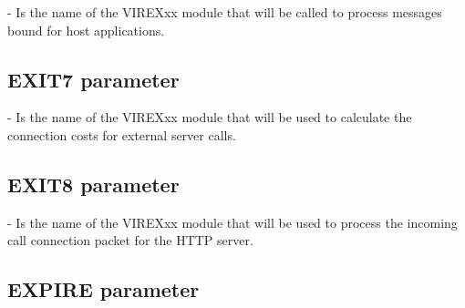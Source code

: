 \documentclass[letterpaper,10pt,english]{sphinxmanual}
\begin{document}
 - Is the name of the VIREXxx module that will be called to process messages bound for host applications.

\ignorespaces 

\subsection{EXIT7 parameter}
\label{\detokenize{Installation_Guide:exit7-parameter}}\label{\detokenize{Installation_Guide:index-61}}
\begin{sphinxVerbatim}[commandchars=\\\{\}]
 
\end{sphinxVerbatim}

 - Is the name of the VIREXxx module that will be used to calculate the connection costs for external server calls.

\ignorespaces 

\subsection{EXIT8 parameter}
\label{\detokenize{Installation_Guide:exit8-parameter}}\label{\detokenize{Installation_Guide:index-62}}
\begin{sphinxVerbatim}[commandchars=\\\{\}]
 
\end{sphinxVerbatim}

 - Is the name of the VIREXxx module that will be used to process the incoming call connection packet for the HTTP server.

\ignorespaces 

\subsection{EXPIRE parameter}
\label{\detokenize{Installation_Guide:expire-parameter}}\label{\detokenize{Installation_Guide:index-63}}
\begin{sphinxVerbatim}[commandchars=\\\{\}]
 
\end{sphinxVerbatim}
\end{document}
